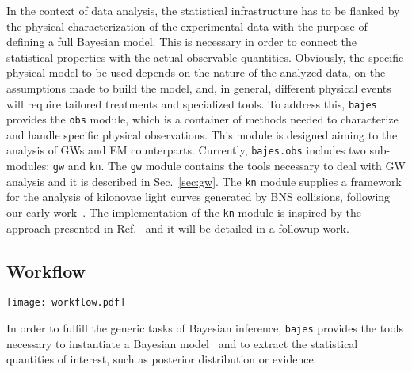 \documentclass[prd,aps,twocolumn,a4paper,showkeys,nofootinbib,floatfix]{revtex4-1}
\newcommand{\bajes}{{\tt bajes}}
\begin{document}
In the context of data analysis,
the statistical infrastructure has to be flanked by the physical 
characterization of the experimental data with the purpose of defining a full Bayesian model. 
This is necessary in order to connect the statistical properties with the actual
observable quantities.
Obviously, the specific physical model to be used depends 
on the nature of the analyzed data, 
on the assumptions made to build the model,
and, in general, different physical events will require 
tailored treatments and specialized tools.
To address this,
{\bajes} provides the {\tt obs} module,
which is a container of methods needed to characterize and 
handle specific physical observations.
This module is designed aiming to the analysis of GWs
and EM counterparts.
Currently, {\tt bajes.obs} includes two sub-modules: {\tt gw} and {\tt kn}.
The {\tt gw} module contains the tools necessary to deal 
with GW analysis and it is 
described in Sec.~\ref{sec:gw}.
The {\tt kn} module supplies a framework
for the analysis of kilonovae light curves 
generated by BNS collisions, following our early work~\cite{Breschi:2021tbm}.
The implementation of the {\tt kn} module is inspired by
the approach presented in Ref.~\cite{Perego:2017wtu,Breschi:2021tbm} 
and it will be detailed in a followup work.

\subsection{Workflow} 
\label{sec:workflow}

\begin{figure*}[t]
	\centering 
	\texttt{[image: workflow.pdf]}
	\caption{Schematic representation of the workflow 
					described in Sec.~\ref{sec:workflow}.
					The scheme highlights the three stages of the Bayesian formalism:
					formulation of the model,
					fitting the model to the data 
					and inference of the model properties.
					The gray box constituted by likelihood function and prior
					assumptions represents the Bayesian model to be inferred.
					The dashed back-propagating line refer to the case in which the 
					analysis is iterated with an improved description.
	}
	\label{fig:work}
\end{figure*}

 In order to fulfill the generic tasks of Bayesian inference, 
{\bajes} provides the tools necessary to instantiate a Bayesian model~\cite{gelman2020bayesian}
and to extract the statistical quantities of interest, such as posterior distribution or evidence. 
\end{document}
